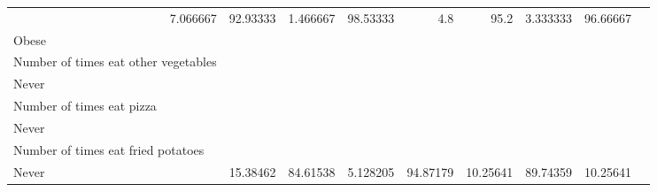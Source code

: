\documentclass{article}
\begin{document}
\begin{tabular}{lllllllll}
  \multicolumn{1}{|r}{7.066667} &
  \multicolumn{1}{r}{92.93333} &
  \multicolumn{1}{r}{1.466667} &
  \multicolumn{1}{r}{98.53333} &
  \multicolumn{1}{r}{4.8} &
  \multicolumn{1}{r}{95.2} &
  \multicolumn{1}{r}{3.333333} &
  \multicolumn{1}{r}{96.66667} \\
\multicolumn{1}{l}{\hspace{1em}Obese} &
  \multicolumn{1}{|r}{} &
  \multicolumn{1}{r}{} &
  \multicolumn{1}{r}{} &
  \multicolumn{1}{r}{} &
  \multicolumn{1}{r}{} &
  \multicolumn{1}{r}{} &
  \multicolumn{1}{r}{} &
  \multicolumn{1}{r}{} \\
\multicolumn{1}{l}{\hspace{2em}Number of times eat other vegetables} &
  \multicolumn{1}{|r}{} &
  \multicolumn{1}{r}{} &
  \multicolumn{1}{r}{} &
  \multicolumn{1}{r}{} &
  \multicolumn{1}{r}{} &
  \multicolumn{1}{r}{} &
  \multicolumn{1}{r}{} &
  \multicolumn{1}{r}{} \\
\multicolumn{1}{l}{\hspace{3em}Never} &
  \multicolumn{1}{|r}{} &
  \multicolumn{1}{r}{} &
  \multicolumn{1}{r}{} &
  \multicolumn{1}{r}{} &
  \multicolumn{1}{r}{} &
  \multicolumn{1}{r}{} &
  \multicolumn{1}{r}{} &
  \multicolumn{1}{r}{} \\
\multicolumn{1}{l}{\hspace{4em}Number of times eat pizza} &
  \multicolumn{1}{|r}{} &
  \multicolumn{1}{r}{} &
  \multicolumn{1}{r}{} &
  \multicolumn{1}{r}{} &
  \multicolumn{1}{r}{} &
  \multicolumn{1}{r}{} &
  \multicolumn{1}{r}{} &
  \multicolumn{1}{r}{} \\
\multicolumn{1}{l}{\hspace{5em}Never} &
  \multicolumn{1}{|r}{} &
  \multicolumn{1}{r}{} &
  \multicolumn{1}{r}{} &
  \multicolumn{1}{r}{} &
  \multicolumn{1}{r}{} &
  \multicolumn{1}{r}{} &
  \multicolumn{1}{r}{} &
  \multicolumn{1}{r}{} \\
\multicolumn{1}{l}{\hspace{6em}Number of times eat fried potatoes} &
  \multicolumn{1}{|r}{} &
  \multicolumn{1}{r}{} &
  \multicolumn{1}{r}{} &
  \multicolumn{1}{r}{} &
  \multicolumn{1}{r}{} &
  \multicolumn{1}{r}{} &
  \multicolumn{1}{r}{} &
  \multicolumn{1}{r}{} \\
\multicolumn{1}{l}{\hspace{7em}Never} &
  \multicolumn{1}{|r}{15.38462} &
  \multicolumn{1}{r}{84.61538} &
  \multicolumn{1}{r}{5.128205} &
  \multicolumn{1}{r}{94.87179} &
  \multicolumn{1}{r}{10.25641} &
  \multicolumn{1}{r}{89.74359} &
  \multicolumn{1}{r}{10.25641} &

\end{tabular}
\end{document}
